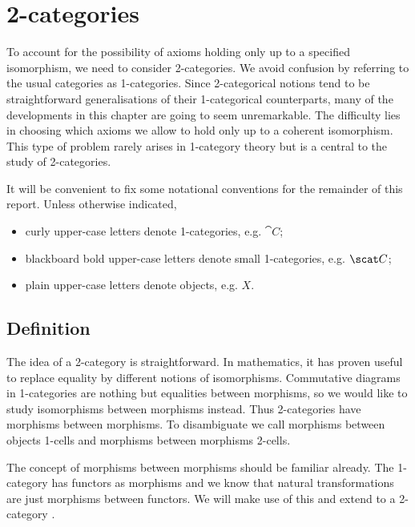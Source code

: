 \chapter{2-categories}\label{sec:2categories}

To account for the possibility of axioms holding only up to a specified
isomorphism, we need to consider 2-categories. We avoid confusion by referring
to  the usual categories as 1-categories. Since 2-categorical notions tend to
be straightforward generalisations of their 1-categorical counterparts, many of
the developments in this chapter are going to seem unremarkable. The difficulty
lies in choosing which axioms we allow to hold only up to a coherent
isomorphism. This type of problem rarely arises in 1-category theory but is a
central to the study of 2-categories.

\begin{notation}
  It will be convenient to fix some notational conventions for the remainder of this report.
  Unless otherwise indicated,
  \begin{itemize}
    \item curly upper-case letters denote 1-categories, e.g. $\cat{C}$;
    \item blackboard bold upper-case letters denote small 1-categories, e.g. $\scat C$;
    \item plain upper-case letters denote objects, e.g. $X$.
  \end{itemize}
\end{notation}


\section{Definition}

The idea of a 2-category is straightforward. In mathematics, it has proven useful
to replace equality by different notions of isomorphisms. Commutative diagrams in
1-categories are nothing but equalities between morphisms, so we would like to study
isomorphisms between morphisms instead. Thus 2-categories have morphisms between morphisms.
To disambiguate we call morphisms between objects 1-cells and morphisms between morphisms
2-cells.

The concept of morphisms between morphisms should be familiar already. The 1-category
\CAT{} has functors as morphisms and we know that natural transformations are just
morphisms between functors. We will make use of this and extend \CAT{} to a 2-category
\biCAT{}.

